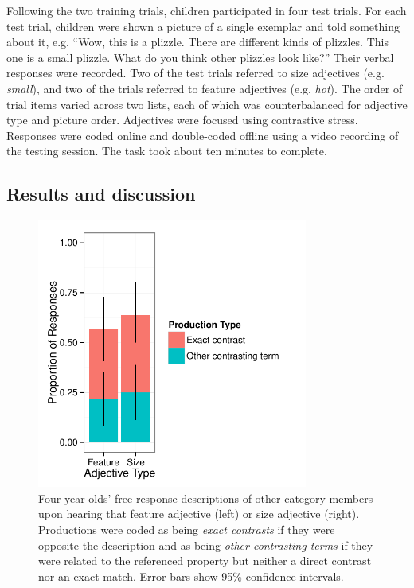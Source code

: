 \documentclass[man]{apa2}
\begin{document}
Following the two training trials, children participated in four test trials.  For each test trial, children were shown a picture of a single exemplar and told something about it, e.g. ``Wow, this is a plizzle. There are different kinds of plizzles. This one is a small plizzle.  What do you think other plizzles look like?'' Their verbal responses were recorded.  Two of the test trials referred to size adjectives (e.g. \emph{small}), and two of the trials referred to feature adjectives (e.g. \emph{hot}).  The order of trial items varied across two lists, each of which was counterbalanced for adjective type and picture order.  Adjectives were focused using contrastive stress. Responses were coded online and double-coded offline using a video recording of the testing session.  The task took about ten minutes to complete. 

\subsection{Results and discussion}

\begin{figure}[t] 
  \begin{center} 
    \includegraphics[width=3.5in]{figures/expt3.pdf} 
    \caption{\label{fig:freeResponse} Four-year-olds' free response descriptions of other category members upon hearing that feature adjective (left) or size adjective (right).  Productions were coded as being \emph{exact contrasts} if they were opposite the description and as being \emph{other contrasting terms} if they were related to the referenced property but neither a direct contrast nor an exact match. Error bars show 95\% confidence intervals. }
  \end{center} 
\end{figure}
\end{document}
